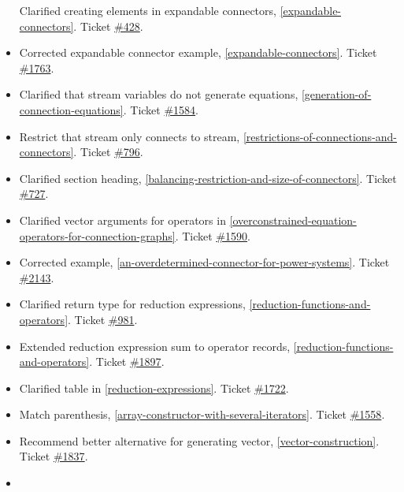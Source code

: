 \begin{itemize}
  Clarified creating elements in expandable connectors, \cref{expandable-connectors}.
  Ticket \href{https://github.com/modelica/ModelicaSpecification/issues/428}{\#428}.
\item
  Corrected expandable connector example, \cref{expandable-connectors}. Ticket
  \href{https://github.com/modelica/ModelicaSpecification/issues/1763}{\#1763}.
\item
  Clarified that stream variables do not generate equations, \cref{generation-of-connection-equations}.
  Ticket \href{https://github.com/modelica/ModelicaSpecification/issues/1584}{\#1584}.
\item
  Restrict that stream only connects to stream, \cref{restrictions-of-connections-and-connectors}. Ticket
  \href{https://github.com/modelica/ModelicaSpecification/issues/796}{\#796}.
\item
  Clarified section heading, \cref{balancing-restriction-and-size-of-connectors}. Ticket
  \href{https://github.com/modelica/ModelicaSpecification/issues/727}{\#727}.
\item
  Clarified vector arguments for operators in \cref{overconstrained-equation-operators-for-connection-graphs}. Ticket
  \href{https://github.com/modelica/ModelicaSpecification/issues/1590}{\#1590}.
\item
  Corrected example, \cref{an-overdetermined-connector-for-power-systems}. Ticket
  \href{https://github.com/modelica/ModelicaSpecification/issues/2143}{\#2143}.
\item
  Clarified return type for reduction expressions, \cref{reduction-functions-and-operators}.
  Ticket \href{https://github.com/modelica/ModelicaSpecification/issues/981}{\#981}.
\item
  Extended reduction expression sum to operator records, \cref{reduction-functions-and-operators}.
  Ticket \href{https://github.com/modelica/ModelicaSpecification/issues/1897}{\#1897}.
\item
  Clarified table in \cref{reduction-expressions}. Ticket
  \href{https://github.com/modelica/ModelicaSpecification/issues/1722}{\#1722}.
\item
  Match parenthesis, \cref{array-constructor-with-several-iterators}. Ticket
  \href{https://github.com/modelica/ModelicaSpecification/issues/1558}{\#1558}.
\item
  Recommend better alternative for generating vector, \cref{vector-construction}.
  Ticket \href{https://github.com/modelica/ModelicaSpecification/issues/1837}{\#1837}.
\item

\end{itemize}
